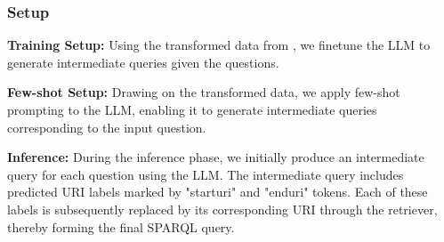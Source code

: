 



\subsubsection{Setup}
\label{sec:inference}

\noindent \textbf{Training Setup:} Using the transformed data from , we finetune the LLM to generate intermediate queries given the questions.

\noindent \textbf{Few-shot Setup:} Drawing on the transformed data, we apply few-shot prompting to the LLM, enabling it to generate intermediate queries corresponding to the input question.

\noindent \textbf{Inference:} During the inference phase, we initially produce an intermediate query for each question using the LLM. The intermediate query includes predicted URI labels marked by "starturi" and "enduri" tokens. Each of these labels is subsequently replaced by its corresponding URI through the retriever, thereby forming the final SPARQL query.


